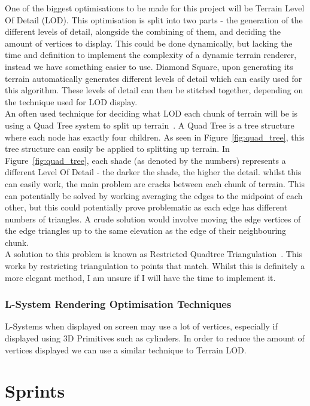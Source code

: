 \documentclass[a4paper,10pt]{report}
\begin{document}
One of the biggest optimisations to be made for this project will be Terrain Level Of Detail (LOD). This optimisation is split into two parts - the generation of the different levels of detail, alongside the combining of them, and deciding the amount of vertices to display. This could be done dynamically, but lacking the time and definition  to implement the complexity of a dynamic terrain renderer, instead we have something easier to use. Diamond Square, upon generating its terrain automatically generates different levels of detail which can easily used for this algorithm. These levels of detail can then be stitched together, depending on the technique used for LOD display. \\

An often used technique for deciding what LOD each chunk of terrain will be is using a Quad Tree system to split up terrain~\cite{pajarola1998large}. A Quad Tree is a tree structure where each node has exactly four children. As seen in Figure~\ref{fig:quad_tree}, this tree structure can easily be applied to splitting up terrain. In Figure~\ref{fig:quad_tree}, each shade (as denoted by the numbers) represents a different Level Of Detail - the darker the shade, the higher the detail. whilst this can easily work, the main problem are cracks between each chunk of terrain. This can potentially be solved by working averaging the edges to the midpoint of each other, but this could potentially prove problematic as each edge has different numbers of triangles. A crude solution would involve moving the edge vertices of the edge triangles up to the same elevation as the edge of their neighbouring chunk. \\

A solution to this problem is known as Restricted Quadtree Triangulation~\cite{pajarola1998large}. This works by restricting triangulation to points that match. Whilst this is definitely a more elegant method, I am unsure if I will have the time to implement it. 

\subsection{L-System Rendering Optimisation Techniques}
L-Systems when displayed on screen may use a lot of vertices, especially if displayed using 3D Primitives such as cylinders. In order to reduce the amount of vertices displayed we can use a similar technique to Terrain LOD. 


\chapter{Sprints}
\end{document}
